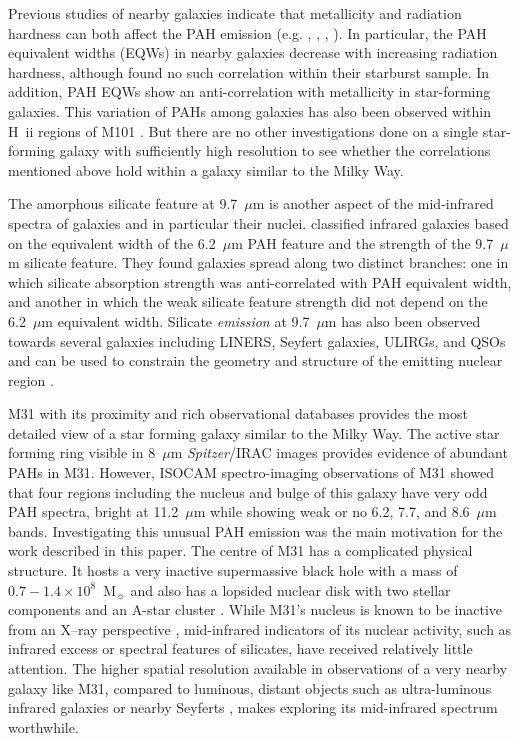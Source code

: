Previous studies of nearby galaxies indicate that metallicity and radiation hardness can both affect the PAH emission (e.g. \citealt{Madden:00}, \citealt{Beirao:06}, \citealt{Engelbracht_2008}, \citealt{Munoz:09}). In particular, the PAH equivalent widths (EQWs) in nearby galaxies decrease with increasing radiation hardness, although \citet{Brandl2006} found no such correlation within their starburst sample. In addition, PAH EQWs show an anti-correlation with metallicity in star-forming galaxies. This variation of PAHs among galaxies has also been observed within H~{\sc ii} regions 
of M101 \citep{Gordon:2008lr}. But there are no other investigations done on a single star-forming galaxy with sufficiently high resolution to see whether the correlations mentioned above hold within a galaxy similar to the Milky Way.

The amorphous silicate feature at 9.7~$\mu$m is another aspect of the mid-infrared spectra of galaxies and in particular their nuclei.  \citet{Spoon2007} 
classified infrared galaxies based on the equivalent width of the 6.2~$\mu$m PAH feature and the strength of the 9.7~$\mu$m silicate feature. 
They  found galaxies spread along two distinct branches: one in which silicate absorption strength was anti-correlated with PAH
equivalent width, and another in which the weak silicate feature strength did not depend on the 6.2~$\mu$m equivalent width.
Silicate {\em emission} at 9.7~$\mu$m has also been observed  towards several galaxies including LINERS, Seyfert galaxies, ULIRGs, and QSOs \citep[e.g.][]{Sturm2005, Hao2005, Spoon2007, Mason2012} 
and can be used to constrain the geometry and structure of the emitting nuclear region \citep{Mason2009}.



M31 with its proximity \citep[$785\pm25$ kpc; ][]{Mcc2005} and rich observational databases provides the most detailed view of a star forming galaxy similar 
to the Milky Way. The active star forming ring visible in 8~$\mu$m  {\em Spitzer}/IRAC images \citep{Barmby2006lr} provides evidence of abundant PAHs in M31. 
However, ISOCAM spectro-imaging observations of M31\citep{1998Cesarsky} showed that four regions including the nucleus and bulge 
of this galaxy have very odd PAH spectra, bright at 11.2~$\mu$m while showing weak or no  6.2, 7.7, and 8.6~$\mu$m bands. 
Investigating this unusual PAH emission was the main motivation for the work described in this paper. 
The centre of M31 has a complicated physical structure. It hosts a very inactive supermassive black hole with a mass of 
$0.7-1.4 \times 10^8$~M$_{\sun}$ \citep{Bacon2001, Bender2005} and also has a lopsided nuclear disk  with two stellar 
components \citep{Lauer1993} and an A-star cluster \citep{Bender2005}. While M31's nucleus is known to be inactive from an 
X--ray perspective \citep{Li2011}, mid-infrared indicators of its nuclear activity, such
as infrared excess or spectral features of silicates,  have received relatively little attention. 
The higher spatial resolution available in observations of  a very nearby galaxy like M31, compared to 
luminous, distant objects such as ultra-luminous infrared galaxies \citep{Spoon2007} or nearby Seyferts \citep{Mason2009},
makes exploring its mid-infrared spectrum worthwhile.



